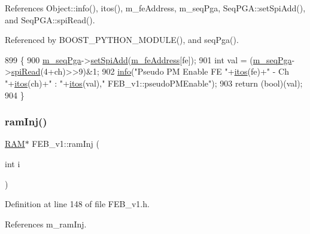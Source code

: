 References Object\+::info(), itos(), m\+\_\+fe\+Address, m\+\_\+seq\+Pga, Seq\+P\+G\+A\+::set\+Spi\+Add(), and Seq\+P\+G\+A\+::spi\+Read().



Referenced by B\+O\+O\+S\+T\+\_\+\+P\+Y\+T\+H\+O\+N\+\_\+\+M\+O\+D\+U\+L\+E(), and seq\+Pga().


\begin{DoxyCode}
899                                             \{
900   \hyperlink{classFEB__v1_a6c7804ac86796f233a8393043adf2e77}{m\_seqPga}->\hyperlink{classSeqPGA_ac998ce3a6d9b5f2e88cc8393f8c1df53}{setSpiAdd}(\hyperlink{classFEB__v1_a4e1945c2d5b434125f375e9d0fc6d99f}{m\_feAddress}[fe]);
901   \textcolor{keywordtype}{int} val = (\hyperlink{classFEB__v1_a6c7804ac86796f233a8393043adf2e77}{m\_seqPga}->\hyperlink{classSeqPGA_ab3d0e5e5d4014bc7a92588a76b8713d4}{spiRead}(4+ch)>>9)&1;
902   \hyperlink{classObject_a644fd329ea4cb85f54fa6846484b84a8}{info}(\textcolor{stringliteral}{"Pseudo PM Enable FE "}+\hyperlink{Tools_8h_af330027dbdafb9a30768b3613c553e60}{itos}(fe)+\textcolor{stringliteral}{" - Ch "}+\hyperlink{Tools_8h_af330027dbdafb9a30768b3613c553e60}{itos}(ch)+\textcolor{stringliteral}{" : "}+\hyperlink{Tools_8h_af330027dbdafb9a30768b3613c553e60}{itos}(val),\textcolor{stringliteral}{"
      FEB\_v1::pseudoPMEnable"});
903   \textcolor{keywordflow}{return} (\textcolor{keywordtype}{bool})(val);
904 \}
\end{DoxyCode}
\mbox{\label{classFEB__v1_aceff066f476794fefe2712e43bc2d6d2}} 
\subsubsection{\texorpdfstring{ram\+Inj()}{ramInj()}}
{\footnotesize\ttfamily \hyperlink{classRAM}{R\+AM}$\ast$ F\+E\+B\+\_\+v1\+::ram\+Inj (\begin{DoxyParamCaption}\item[{int}]{i }\end{DoxyParamCaption})\hspace{0.3cm}{\ttfamily [inline]}}



Definition at line 148 of file F\+E\+B\+\_\+v1.\+h.



References m\+\_\+ram\+Inj.



